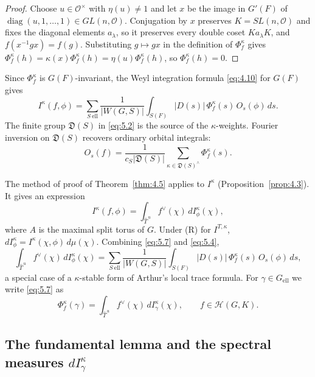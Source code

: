 \documentclass[12pt,letterpaper]{article}
\numberwithin{equation}{section}
\theoremstyle{plain}
\theoremstyle{remark}
\theoremstyle{plain}
\theoremstyle{definition}
\theoremstyle{remark}
\theoremstyle{remark}
\newcommand{\OO}{\mathcal{O}}
\newcommand{\Hc}{\mathcal{H}}
\newcommand{\Thu}{\widehat{T}^{\,u}}
\DeclareMathOperator{\diag}{diag}
\newcommand{\ellr}{\mathrm{ell}}
\begin{document}
\begin{proof}
Choose $u\in\OO^\times$ with $\eta(u)\ne1$ and let $x$ be the image in $G'(F)$ of $\diag(u,1,\dots,1)\in GL(n,\OO)$. Conjugation by $x$ preserves $K=SL(n,\OO)$ and fixes the diagonal elements $a_\lambda$, so it preserves every double coset $Ka_\lambda K$, and $f(x^{-1}gx)=f(g)$. Substituting $g\mapsto gx$ in the definition of $\Phi^\kappa_f$ gives $\Phi^\kappa_f(h)=\kappa(x)\Phi^\kappa_f(h)=\eta(u)\Phi^\kappa_f(h)$, so $\Phi^\kappa_f(h)=0$.
\end{proof}

Since $\Phi^\kappa_f$ is $G(F)$-invariant, the Weyl integration formula \eqref{eq:4.10} for $G(F)$ gives
\setcounter{equation}{3}\begin{equation}\label{eq:5.4}
I^\kappa(f,\phi)=\sum_{S\ \ellr}\frac{1}{|W(G,S)|}\int_{S(F)}|D(s)|\,\Phi^\kappa_f(s)\,O_s(\phi)\,ds.
\end{equation}
The finite group $\mathfrak D(S)$ in \eqref{eq:5.2} is the source of the $\kappa$-weights. Fourier inversion on $\mathfrak D(S)$ recovers ordinary orbital integrals:
\begin{equation}\tag{5.4A}\label{eq:5.4A}
O_s(f)=\frac{1}{c_S|\mathfrak D(S)|}\sum_{\kappa\in\mathfrak D(S)^\wedge}\Phi^\kappa_f(s).
\end{equation}

The method of proof of Theorem~\ref{thm:4.5} applies to $I^\kappa$ (Proposition~\ref{prop:4.3}). It gives an expression
\setcounter{equation}{6}\begin{equation}\label{eq:5.7}
I^\kappa(f,\phi)=\int_{\Thu}f^\vee(\chi)\,dI^\kappa_\phi(\chi),
\end{equation}
where $A$ is the maximal split torus of $G$. Under (R) for $I^{T,\kappa}$, $dI^\kappa_\phi=I^\kappa(\chi,\phi)\,d\mu(\chi)$. Combining \eqref{eq:5.7} and \eqref{eq:5.4},
\begin{equation}\label{eq:5.8}
\int_{\Thu}f^\vee(\chi)\,dI^\kappa_\phi(\chi)=\sum_{S\ \ellr}\frac{1}{|W(G,S)|}\int_{S(F)}|D(s)|\,\Phi^\kappa_f(s)\,O_s(\phi)\,ds,
\end{equation}
a special case of a $\kappa$-stable form of Arthur's local trace formula. For $\gamma\in G_{\ellr}$ we write \eqref{eq:5.7} as
\begin{equation}\label{eq:5.9}
\Phi^\kappa_f(\gamma)=\int_{\Thu}f^\vee(\chi)\,dI^\kappa_\gamma(\chi),\qquad f\in\Hc(G,K).
\end{equation}

\subsection{The fundamental lemma and the spectral measures \texorpdfstring{$dI^\kappa_\gamma$}{dI(kappa,gamma)}}\label{sec:5.2}
\end{document}
